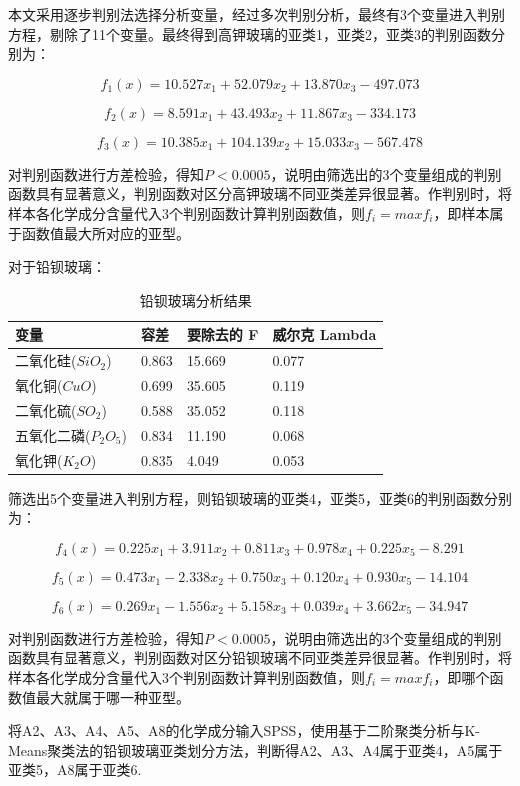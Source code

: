 \documentclass{my_paper}
\begin{document}
本文采用逐步判别法选择分析变量，经过多次判别分析，最终有3个变量进入判别方程，剔除了11个变量。最终得到高钾玻璃的亚类1，亚类2，亚类3的判别函数分别为：

$$f_{1}(x)=10.527 x_{1}+52.079 x_{2}+13.870 x_{3}-497.073$$

$$f_{2}(x)=8.591 x_{1}+43.493 x_{2}+11.867 x_{3}-334.173 $$

$$f_{3}(x)=10.385 x_{1}+104.139 x_{2}+15.033 x_{3}-567.478$$

对判别函数进行方差检验，得知$P<0.000 5$，说明由筛选出的3个变量组成的判别函数具有显著意义，判别函数对区分高钾玻璃不同亚类差异很显著。作判别时，将样本各化学成分含量代入3个判别函数计算判别函数值，则$f_i=max{f_i}$，即样本属于函数值最大所对应的亚型。

对于铅钡玻璃：

\begin{table}[H]
    \centering
    \caption{铅钡玻璃分析结果}
    \begin{tabular}{llll}
    \hline
        变量 & 容差 & 要除去的 F & 威尔克 Lambda \\ \hline
        二氧化硅($SiO_2$) & 0.863 & 15.669 & 0.077 \\ 
        氧化铜($CuO$) & 0.699 & 35.605 & 0.119 \\ 
        二氧化硫($SO_2$) & 0.588 & 35.052 & 0.118 \\ 
        五氧化二磷($P_2O_5$) & 0.834 & 11.190 & 0.068 \\ 
        氧化钾($K_2O$) & 0.835 & 4.049 & 0.053 \\ \hline
    \end{tabular}
\end{table}
筛选出5个变量进入判别方程，则铅钡玻璃的亚类4，亚类5，亚类6的判别函数分别为： 

$$f_{4}(x)=0.225 x_{1}+3.911 x_{2}+0.811 x_{3}+0.978 x_{4}+0.225 x_{5}-8.291$$

$$f_{5}(x)=0.473 x_{1}-2.338 x_{2}+0.750 x_{3}+0.120 x_{4}+0.930 x_{5}-14.104$$ 

$$f_{6}(x)=0.269 x_{1}-1.556 x_{2}+5.158 x_{3}+0.039 x_{4}+3.662 x_{5}-34.947$$

对判别函数进行方差检验，得知$P<0.000 5$，说明由筛选出的3个变量组成的判别函数具有显著意义，判别函数对区分铅钡玻璃不同亚类差异很显著。作判别时，将样本各化学成分含量代入3个判别函数计算判别函数值，则$f_i=max{f_i}$，即哪个函数值最大就属于哪一种亚型。



将A2、A3、A4、A5、A8的化学成分输入SPSS，使用基于二阶聚类分析与K-Means聚类法的铅钡玻璃亚类划分方法，判断得A2、A3、A4属于亚类4，A5属于亚类5，A8属于亚类6.
\end{document}
